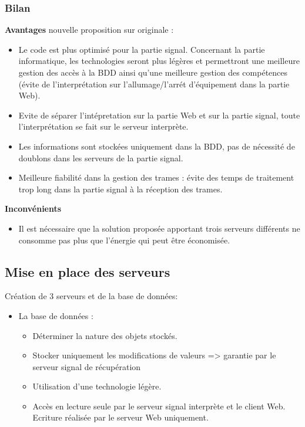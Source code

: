 \documentclass[10pt,a4paper]{article}
\begin{document}
\subsubsection{Bilan}
\textbf{Avantages} nouvelle proposition sur originale :
\begin{itemize}
  \item Le code est plus optimisé pour la partie signal. Concernant la partie informatique, les technologies seront plus légères et permettront une meilleure gestion des accès à la BDD ainsi qu'une meilleure gestion des compétences (évite de l'interprétation sur l'allumage/l'arrét d'équipement dans la partie Web).
  \item Evite de séparer l'intépretation sur la partie Web et sur la partie signal, toute l'interprétation se fait sur le serveur interprète.
  \item Les informations sont stockées uniquement dans la BDD, pas de nécessité de doublons dans les serveurs de la partie signal.
  \item Meilleure fiabilité dans la gestion des trames : évite des temps de traitement trop long dans la partie signal à la réception des trames.
\end{itemize}
\textbf{Inconvénients}
\begin{itemize}
  \item Il est nécessaire que la solution proposée apportant trois serveurs différents ne consomme pas plus que l'énergie qui peut être économisée.
\end{itemize}

\subsection{Mise en place des serveurs}

Création de 3 serveurs et de la base de données:

\begin{itemize}
  \item La base de données :
  \begin{itemize}
    \item Déterminer la nature des objets stockés.
    \item Stocker uniquement les modifications de valeurs => garantie par le serveur signal de récupération
    \item Utilisation d'une technologie légère.
    \item Accès en lecture seule par le serveur signal interprète et le client Web. Ecriture réalisée par le serveur Web uniquement.
  \end{itemize}
\end{itemize}
\end{document}
